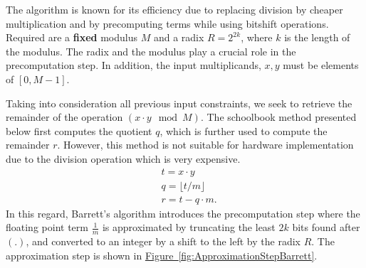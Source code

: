 \documentclass[11pt,
  titlepage=false,
  abstract=on,
]{scrreprt}
\begin{document}
The algorithm is known for its efficiency due to replacing division by cheaper multiplication and by precomputing terms while using bitshift operations.
Required are a \textbf{fixed} modulus $M$ and a radix $R = 2^{2k}$, where $k$ is the length of the modulus. The radix and the modulus play a crucial role in the precomputation step.
In addition, the input multiplicands, $x, y$ must be elements of $[0, M-1]$.

Taking into consideration all previous input constraints, we seek to retrieve the remainder of the operation $(x \cdot y \mod M)$.
The schoolbook method presented below \cite{ModArith} first computes the quotient $q$, which is further used to compute the remainder $r$.
However, this method is not suitable for hardware implementation due to the division operation which is very expensive.
\begin{align*}
  &t = x \cdot y\\
  &q = \lfloor t / m \rfloor\\
  &r = t - q \cdot m.
\end{align*}
In this regard, Barrett's algorithm introduces the precomputation step where the floating point term $\frac{1}{m}$ is approximated by truncating the least $2k$ bits found after $(.)$,
and converted to an integer by a shift to the left by the radix $R$. The approximation step is shown in \hyperref[fig:ApproximationStepBarrett]{Figure~\ref{fig:ApproximationStepBarrett}}.


\end{document}
